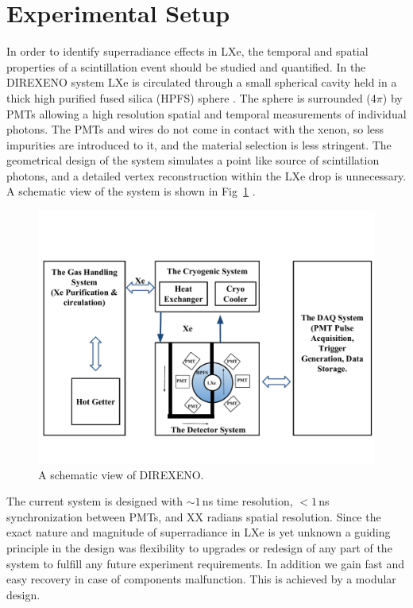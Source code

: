 \section{Experimental Setup}
\label{expSetup}


In order to identify superradiance effects in LXe, the temporal and spatial properties of a scintillation event should be studied and quantified. In the DIREXENO system LXe is circulated through a small spherical cavity held in a thick high purified fused silica (HPFS) sphere . The sphere is surrounded (4$\pi$) by PMTs allowing a high resolution spatial and temporal measurements of individual photons. The PMTs and wires do not come in contact with the xenon, so less impurities are introduced to it, and the material selection is less stringent. The geometrical design of the system simulates a point like source of scintillation photons, and a detailed vertex reconstruction within the LXe drop is unnecessary. A schematic view of the system is shown in Fig~\ref{fig:detSch} . 

\begin{figure}[h]
\centerline{\includegraphics[width=0.8\linewidth]{DetSch.pdf}}
\caption{A schematic view of DIREXENO.}
\label{fig:detSch}
\end{figure}


The current system is designed with  $\sim1$\,ns time resolution, $<1$\,ns synchronization between PMTs, and XX radians spatial resolution. Since the exact nature and magnitude of superradiance in LXe is yet unknown a guiding principle in the design was flexibility to upgrades or redesign of any part of the system to fulfill any future experiment requirements. In addition we gain fast and easy recovery in case of components malfunction. This is achieved by a modular design. 

